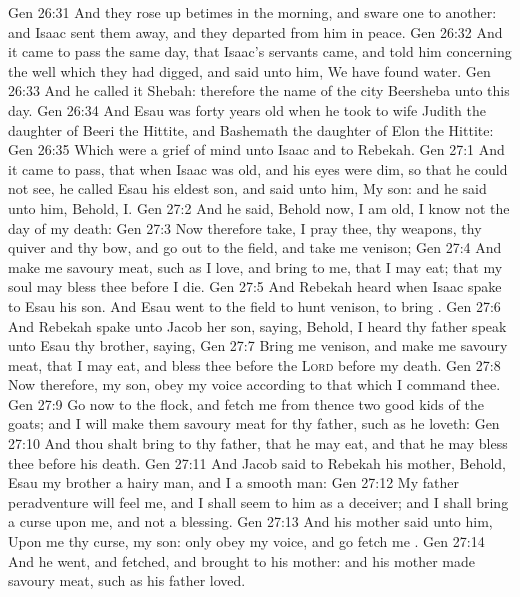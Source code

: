 \vs Gen 26:31 And they rose up betimes in the morning, and sware one to another: and Isaac sent them away, and they departed from him in peace.
\vs Gen 26:32 And it came to pass the same day, that Isaac's servants came, and told him concerning the well which they had digged, and said unto him, We have found water.
\vs Gen 26:33 And he called it Shebah: therefore the name of the city  Beersheba unto this day.
\vs Gen 26:34 And Esau was forty years old when he took to wife Judith the daughter of Beeri the Hittite, and Bashemath the daughter of Elon the Hittite:
\vs Gen 26:35 Which were a grief of mind unto Isaac and to Rebekah.
\vs Gen 27:1 And it came to pass, that when Isaac was old, and his eyes were dim, so that he could not see, he called Esau his eldest son, and said unto him, My son: and he said unto him, Behold,  I.
\vs Gen 27:2 And he said, Behold now, I am old, I know not the day of my death:
\vs Gen 27:3 Now therefore take, I pray thee, thy weapons, thy quiver and thy bow, and go out to the field, and take me  venison;
\vs Gen 27:4 And make me savoury meat, such as I love, and bring  to me, that I may eat; that my soul may bless thee before I die.
\vs Gen 27:5 And Rebekah heard when Isaac spake to Esau his son. And Esau went to the field to hunt  venison,  to bring .
\vs Gen 27:6 And Rebekah spake unto Jacob her son, saying, Behold, I heard thy father speak unto Esau thy brother, saying,
\vs Gen 27:7 Bring me venison, and make me savoury meat, that I may eat, and bless thee before the \textsc{Lord} before my death.
\vs Gen 27:8 Now therefore, my son, obey my voice according to that which I command thee.
\vs Gen 27:9 Go now to the flock, and fetch me from thence two good kids of the goats; and I will make them savoury meat for thy father, such as he loveth:
\vs Gen 27:10 And thou shalt bring  to thy father, that he may eat, and that he may bless thee before his death.
\vs Gen 27:11 And Jacob said to Rebekah his mother, Behold, Esau my brother  a hairy man, and I  a smooth man:
\vs Gen 27:12 My father peradventure will feel me, and I shall seem to him as a deceiver; and I shall bring a curse upon me, and not a blessing.
\vs Gen 27:13 And his mother said unto him, Upon me  thy curse, my son: only obey my voice, and go fetch me .
\vs Gen 27:14 And he went, and fetched, and brought  to his mother: and his mother made savoury meat, such as his father loved.
